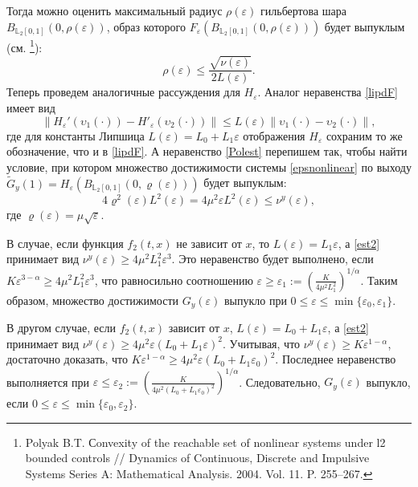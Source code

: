\documentclass[../main.tex]{subfiles}
\begin{document}
	Тогда можно оценить максимальный радиус $ \rho(\varepsilon) $ гильбертова шара $ B_{\mathbb{L}_2[0,1]}(0,\rho(\varepsilon)) $, образ которого $ F_{\varepsilon}(B_{\mathbb{L}_2[0,1]}(0,\rho(\varepsilon))) $ будет выпуклым (см. \footnote{Polyak B.T. Сonvexity of the reachable set of nonlinear
		systems under l2 bounded controls // Dynamics of Continuous, Discrete and Impulsive Systems
		Series A: Mathematical Analysis. 2004. Vol. 11.  P. 255--267.}):
	\begin{equation}\label{Polest}
		\rho(\varepsilon) \leqslant \frac{\sqrt{\nu(\varepsilon)}}{2L(\varepsilon)}.
	\end{equation}
	Теперь проведем аналогичные рассуждения для $ H_{\varepsilon} $. Аналог неравенства \eqref{lipdF}  имеет вид
	\begin{equation*}
		\left\| H_{\varepsilon}'(\upsilon_1(\cdot)) - H'_{\varepsilon}(\upsilon_2(\cdot)) \right\| \leqslant L(\varepsilon) \left\| \upsilon_1(\cdot) - \upsilon_2(\cdot)\right\|,
	\end{equation*}
	где для константы Липшица $ L(\varepsilon) = L_0 + L_1 \varepsilon$ отображения $ H_{\varepsilon} $ сохраним то же обозначение, что и в \eqref{lipdF}.
	А неравенство \eqref{Polest} перепишем так, чтобы найти условие, при котором множество достижимости системы \eqref{epsnonlinear} по выходу $ \widetilde{G}_y(1) = H_{\varepsilon} (B_{\mathbb{L}_2[0,1]}(0,\varrho(\varepsilon)))$ будет выпуклым:
	\begin{equation}\label{est2}
		4\varrho^2(\varepsilon)L^2(\varepsilon) = 4\mu^2\varepsilon L^2(\varepsilon) \leqslant \nu^y(\varepsilon),
	\end{equation}
	где $ \varrho(\varepsilon)  = \mu\sqrt{\varepsilon} $.
	
	В случае, если функция $ f_2(t,x) $ не зависит от $ x $, то $ L(\varepsilon) = L_1 \varepsilon  $, а \eqref{est2} принимает вид $ \nu^y(\varepsilon) \geqslant 4\mu^2L_1^2 \varepsilon^3 $.  Это неравенство будет выполнено, если $ K\varepsilon^{3 - \alpha} \geqslant 4\mu^2L_1^2 \varepsilon^3 $, что равносильно соотношению $ \varepsilon \geqslant \varepsilon_1 := \left(\frac{K}{4\mu^2L_1^2}\right)^{1/\alpha} $.  Таким образом, множество достижимости $ G_y(\varepsilon)$ выпукло при $ 0 \leqslant \varepsilon \leqslant \min\{\varepsilon_0,\varepsilon_1\}  $.  
	
	В другом случае, если $ f_2(t,x) $ зависит от $ x $, $ L(\varepsilon) =L_0+L_1\varepsilon $, а \eqref{est2} принимает вид $ \nu^y(\varepsilon) \geqslant 4\mu^2 \varepsilon (L_0 + L_1 \varepsilon)^2 $.  Учитывая, что $ \nu^y(\varepsilon)  \geqslant K \varepsilon^{1-\alpha} $, достаточно доказать, что $ K \varepsilon^{1-\alpha}  \geqslant 4\mu^2 \varepsilon (L_0 + L_1 \varepsilon_0)^2 $. Последнее неравенство выполняется при $ \varepsilon \leqslant \varepsilon_2 := \left(\frac{K}{4\mu^2(L_0 + L_1\varepsilon_0)^2} \right)^{1/\alpha} $. Следовательно, $ G_y(\varepsilon) $ выпукло, если $ 0 \leqslant \varepsilon \leqslant \min\{\varepsilon_0, \varepsilon_2\} $.
	
\end{document}

